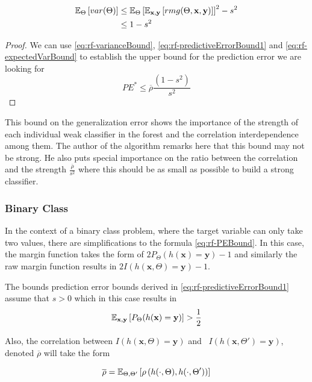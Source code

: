 \begin{equation}\label{eq:rf-expectedVarBound}
\begin{split}
\operatorname{\mathbb{E}}_{\Theta} \left[ var(\Theta) \right]  & \leq \operatorname{\mathbb{E}}_{\Theta} \left[ \operatorname{\mathbb{E}}_{\textbf{x},\textbf{y}}\left[ rmg(\Theta,\textbf{x},\textbf{y})   \right]  \right]^2 -s^2  \\
& \leq 1-s^2
\end{split}
\end{equation}

\begin{proof}
We can use  \ref{eq:rf-varianceBound}, \ref{eq:rf-predictiveErrorBound1} and \ref{eq:rf-expectedVarBound} to establish the upper bound for the prediction error we are looking for
\begin{equation}\label{eq:rf-PEBound}
PE^* \leq \overline{\rho}\frac{(1-s^2)}{s^2}
\end{equation}
\end{proof}

This bound on the generalization error shows the importance of the strength of each individual weak classifier in the forest and the correlation interdependence among them. The author \textcite{breiman-randomforests} of the algorithm remarks here that this bound may not be strong. He also puts special importance on the ratio between the correlation and the strength $\frac{\overline{\rho}}{s^2}$ where this should be as small as possible to build a strong classifier.
\subsubsection{Binary Class}
In the context of a binary class problem, where the target variable can only take two values, there are simplifications to the formula \ref{eq:rf-PEBound}. In this case, the margin function takes the form of $2 P_{\Theta}(h(\textbf{x}) = \textbf{y}) -1$ and similarly the raw margin function results in $2 I(h(\textbf{x}, \Theta) = \textbf{y}) -1$.


The bounds prediction error bounds derived in \ref{eq:rf-predictiveErrorBound1} assume that $s >0$ which in this case results in
$$ \operatorname{\mathbb{E}}_{\textbf{x},\textbf{y}} \left[ P_{\Theta}(h(\textbf{x}) = \textbf{y}) \right] > \frac{1}{2} $$

Also, the correlation between $I(h(\textbf{x}, \Theta) = \textbf{y})$ and \  $I(h(\textbf{x}, \Theta') = \textbf{y})$, denoted $\overline{\rho}$ will take the form

$$ \overline{\rho} =  \operatorname{\mathbb{E}}_{\Theta,\Theta'} \left[ \rho \left( h(\cdot{},\Theta) ,h(\cdot{},\Theta') \right)   \right] $$

